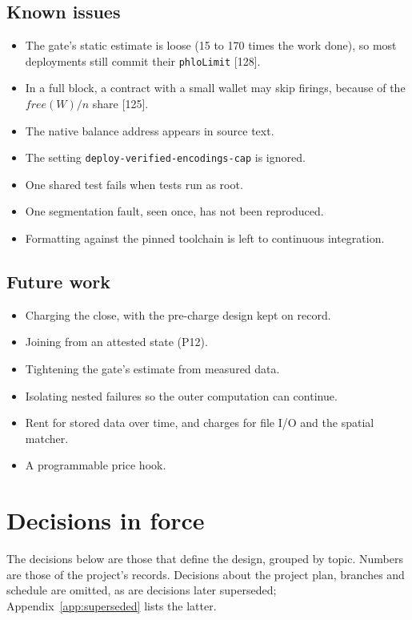 \documentclass[10.5pt]{article}
\newcommand{\code}[1]{\texttt{#1}}
\newcommand{\D}[1]{{\color{muted}\small[#1]}}
\begin{document}
\subsection*{Known issues}
\begin{itemize}
\item The gate's static estimate is loose (15 to 170 times the work done), so most deployments still commit their \code{phloLimit} \D{128}.
\item In a full block, a contract with a small wallet may skip firings, because of the $\mathit{free}(W)/n$ share \D{125}.
\item The native balance address appears in source text.
\item The setting \code{deploy-verified-encodings-cap} is ignored.
\item One shared test fails when tests run as root.
\item One segmentation fault, seen once, has not been reproduced.
\item Formatting against the pinned toolchain is left to continuous integration.
\end{itemize}

\subsection*{Future work}
\begin{itemize}
\item Charging the close, with the pre-charge design kept on record.
\item Joining from an attested state (P12).
\item Tightening the gate's estimate from measured data.
\item Isolating nested failures so the outer computation can continue.
\item Rent for stored data over time, and charges for file I/O and the spatial matcher.
\item A programmable price hook.
\end{itemize}

\newpage
\appendix
\renewcommand{\thesection}{\Alph{section}}
\section{Decisions in force}\label{app:decisions}

The decisions below are those that define the design, grouped by topic. Numbers are those of the project's records. Decisions about the project plan, branches and schedule are omitted, as are decisions later superseded; Appendix~\ref{app:superseded} lists the latter.
\end{document}
